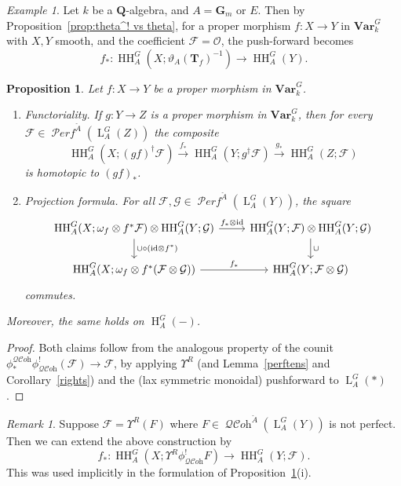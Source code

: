 \documentclass[12pt, oneside]{amsart}
\numberwithin{equation}{section}
\newtheorem{proposition}[subsubsection]{Proposition}
\theoremstyle{remark}
\newtheorem{remark}[subsubsection]{Remark}
\newtheorem{example}[subsubsection]{Example}
\theoremstyle{plain}
\DeclareMathOperator{\QCOH}{\mathcal{QC}\textit{oh}}
\DeclareMathOperator{\PERF}{\mathcal{P}\textit{erf}}
\newcommand{\Loop}{\operatorname{L}}
\newcommand{\OO}{\mathcal{O}}
\newcommand{\GGm}{\mathbf{G}_{m}}
\newcommand{\bQ}{\mathbf{Q}}
\newcommand{\Ren}{\Upsilon}
\newcommand{\Var}{\mathbf{Var}_{k}}
\newcommand{\TT}{\mathbf{T}}
\newcommand{\id}{\mathrm{id}}
\newcommand{\HH}{\operatorname{HH}}
\newcommand{\Hcoh}{\operatorname{H}}
\newcommand{\cF}{\mathcal{F}}
\newcommand{\cG}{\mathcal{G}}
\begin{document}
\begin{example}
	Let $k$ be a $\bQ$-algebra, and $A = \GGm$ or $E$.
	Then by Proposition~\ref{prop:theta^! vs theta}, for a proper morphism $f : X \to Y$ in $\Var^G$ with $X, Y$ smooth, and the coefficient $\cF=\OO$, the push-forward becomes
	\[
	  f_* : \HH_A^G(X; \vartheta_A(\TT_f)^{-1}) \longrightarrow \HH_A^G(Y).
	\]
\end{example}

\begin{proposition}\label{prop:push properties}
Let $f : X \to Y$ be a proper morphism in $\Var^G$.
\begin{enumerate}
\item \emph{Functoriality.}
If $g : Y \to Z$ is a proper morphism in $\Var^G$, then for every $\cF \in \PERF^{\check{A}}(\Loop_A^G(Z))$ the composite
\[
  \HH_A^G(X; (gf)^\dag\cF) \xrightarrow{f_*} \HH_A^G(Y; g^\dag\cF) \xrightarrow{g_*} \HH_A^G(Z; \cF)
\]
is homotopic to $(gf)_*$.

\item \emph{Projection formula.}
For all $\cF, \cG \in \PERF^{\check{A}}(\Loop_A^G(Y))$, the square
\[\begin{tikzcd}
  \HH_A^G(X; \omega_f \otimes f^*\cF) \otimes \HH_A^G(Y; \cG) \ar{r}{f_* \otimes \id}\ar{d}{\cup \circ (\id \otimes f^*)}
  & \HH_A^G(Y; \cF) \otimes \HH_A^G(Y; \cG) \ar{d}{\cup}
  \\
  \HH_A^G(X; \omega_f \otimes f^*(\cF \otimes \cG)) \ar{r}{f_*}
  & \HH_A^G(Y; \cF \otimes \cG)
\end{tikzcd}\]
commutes.
\end{enumerate}
Moreover, the same holds on $\Hcoh_A^G(-)$.
\end{proposition}
\begin{proof}
Both claims follow from the analogous property of the counit $\phi_*^{\QCOH}\phi^!_{\QCOH}(\cF) \to \cF$, by applying $\Ren^R$ (and Lemma~\ref{perftens} and Corollary~\ref{rights}) and the (lax symmetric monoidal) pushforward to $\Loop_A^G(*)$.
\end{proof}

\begin{remark}\label{rem:push not perfect}
Suppose $\cF = \Ren^R(F)$ where $F \in \QCOH^{\check{A}}(\Loop_A^G(Y))$ is not perfect.
Then we can extend the above construction by
\[
  f_* : \HH_A^G(X; \Ren^R\phi^!_{\QCOH}F) \to \HH_A^G(Y; \cF).
\]
This was used implicitly in the formulation of Proposition~\ref{prop:push properties}(i).
\end{remark}
\end{document}
